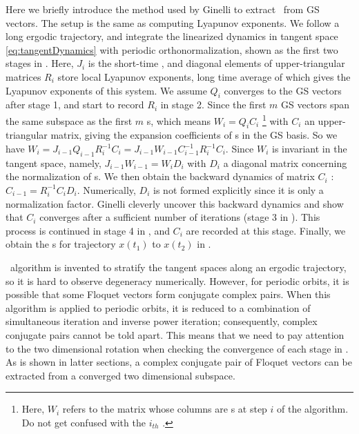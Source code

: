 \documentclass[final,leqno,onefignum,onetabnum]{siamltexmm}
\begin{document}
Here we briefly introduce the method used by
Ginelli {\etal{}}
to extract
\cLvs\ from GS vectors. The setup is the same as computing Lyapunov
exponents. We follow a long ergodic trajectory, and integrate
the linearized dynamics in tangent space \eqref{eq:tangentDynamics}
with periodic orthonormalization, shown as the first two stages in
.
Here, $J_i$ is the {short-time \JacobianM}, and diagonal elements
of upper-triangular
matrices $R_i$ store local
Lyapunov exponents, long time average of which gives the Lyapunov
exponents of this system. We assume $Q_i$ converges to the GS vectors after
stage 1, and start to record $R_i$ in
stage 2. Since the first $m$ GS vectors span the same subspace as the
first $m$ \cLv s, which means
$W_i = Q_i C_i$ \footnote{Here, $W_i$ refers to the matrix
{whose columns
are \cLv s at step $i$ of} the algorithm. Do not get confused with the
$i_{th}$ {\cLv.}
}
with $C_i$ an upper-triangular matrix, giving the expansion
coefficients of \cLv s in the GS basis.
So we have
$W_i = J_{i-1} Q_{i-1} R^{-1}_{i}C_i = J_{i-1}W_{i-1}C_{i-1}^{-1}R^{-1}_{i} C_i$.
Since $W_i$ is invariant in the {
tangent space, namely, $J_{i-1}W_{i-1}=W_iD_i$ with
$D_i$ a diagonal matrix concerning the normalization of \cLv s.
We then obtain the backward dynamics of
matrix $C_i$ : $C_{i-1} = R^{-1}_{i} C_iD_i$. Numerically, $D_i$ is
not formed explicitly since it is only a normalization factor. }
Ginelli {\etal{}}  cleverly uncover
this backward dynamics and show that $C_i$ converges after a sufficient
number of iterations (stage 3 in ). This process
is continued in stage 4 in , and $C_i$ are recorded
{at} this stage. Finally, we obtain the \cLv s for trajectory $x(t_1)$
to $x(t_2)$ in .

{\CLv\ algorithm} is invented to stratify the tangent spaces along
an ergodic trajectory, so it is hard to observe
degeneracy numerically. However, for periodic orbits, it is
possible that some Floquet vectors form conjugate complex pairs.
When this algorithm is applied to periodic orbits, it is reduced
to a combination of simultaneous iteration and {inverse}
power iteration;
consequently, complex conjugate pairs cannot be told apart.
This
means that we need to pay attention to the two dimensional rotation
when checking the convergence of each stage in .
As is shown in latter sections, a complex conjugate pair
of Floquet vectors can be extracted from a converged two
dimensional subspace.
\end{document}
